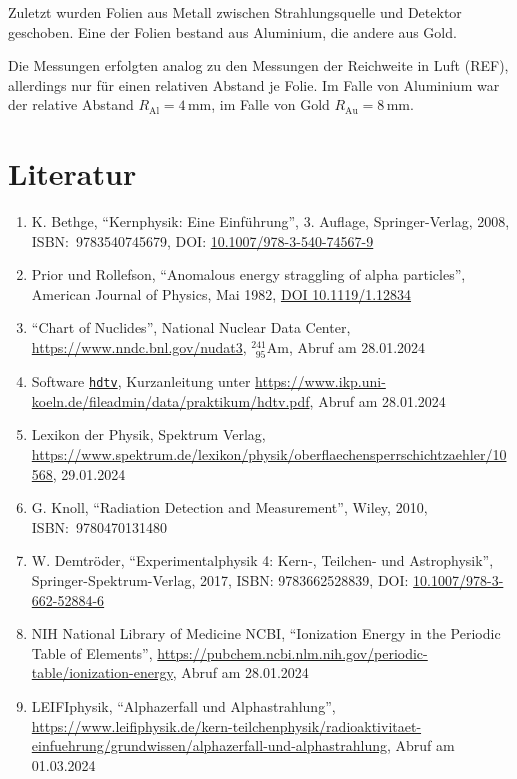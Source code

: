 \documentclass[12pt,a4paper]{scrartcl}
\numberwithin{equation}{section} %
\renewcommand{\[}{} %
\renewcommand{\]}{\noindent} %
\newcommand{\tightlist}{} %
\begin{document}
Zuletzt wurden Folien aus Metall zwischen Strahlungsquelle und Detektor
geschoben. Eine der Folien bestand aus Aluminium, die andere aus Gold.

Die Messungen erfolgten analog zu den Messungen der Reichweite in Luft
(REF), allerdings nur für einen relativen Abstand je Folie. Im Falle von
Aluminium war der relative Abstand \(R_\mathrm{Al}=4\mathrm{\,mm}\), im
Falle von Gold \(R_\mathrm{Au}=8\mathrm{\,mm}\).

\hypertarget{literatur}{%
\section{Literatur}\label{literatur}}

\begin{enumerate}
\def\labelenumi{\arabic{enumi}.}
\tightlist
\item
  K. Bethge, ``Kernphysik: Eine Einführung'', 3. Auflage,
  Springer-Verlag, 2008, \linebreak
  ISBN:~9783540745679, DOI:
  \href{https://doi.org/10.1007/978-3-540-74567-9}{10.1007/978-3-540-74567-9}
\item
  Prior und Rollefson, ``Anomalous energy straggling of alpha
  particles'', American Journal of Physics, Mai 1982,
  \href{https://doi.org/10.1119/1.12834}{DOI 10.1119/1.12834}
\item
  ``Chart of Nuclides'', National Nuclear Data Center,
  \url{https://www.nndc.bnl.gov/nudat3}, \(^{241}_{\ \ 95}\mathrm{Am}\),
  Abruf am 28.01.2024
\item
  Software \href{https://pypi.org/project/hdtv}{\texttt{hdtv}},
  Kurzanleitung unter
  \url{https://www.ikp.uni-koeln.de/fileadmin/data/praktikum/hdtv.pdf},
  Abruf am 28.01.2024
\item
  Lexikon der Physik, Spektrum Verlag,
  \url{https://www.spektrum.de/lexikon/physik/oberflaechensperrschichtzaehler/10568},
  29.01.2024
\item
  G. Knoll, ``Radiation Detection and Measurement'', Wiley, 2010, \linebreak ISBN:~9780470131480
\item
  W. Demtröder, ``Experimentalphysik 4: Kern-, Teilchen- und
  Astrophysik'', \linebreak
  Springer-Spektrum-Verlag, 2017, ISBN: 9783662528839,
  DOI:   \href{https://doi.org/10.1007/978-3-662-52884-6}{10.1007/978-3-662-52884-6}
\item
  NIH National Library of Medicine NCBI,
  ``Ionization Energy in the Periodic Table of Elements'',
  \url{https://pubchem.ncbi.nlm.nih.gov/periodic-table/ionization-energy}, Abruf am 28.01.2024
\item
  LEIFIphysik, ``Alphazerfall und Alphastrahlung'',
  \url{https://www.leifiphysik.de/kern-teilchenphysik/radioaktivitaet-einfuehrung/grundwissen/alphazerfall-und-alphastrahlung},
  Abruf am 01.03.2024
\end{enumerate}
\end{document}
